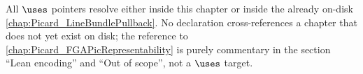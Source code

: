 All \(\uses\) pointers resolve either inside this chapter or inside the already
on-disk \cref{chap:Picard_LineBundlePullback}. No declaration cross-references
a chapter that does not yet exist on disk; the reference to
\cref{chap:Picard_FGAPicRepresentability} is purely commentary in the section
``Lean encoding'' and ``Out of scope'', not a \(\uses\) target.
